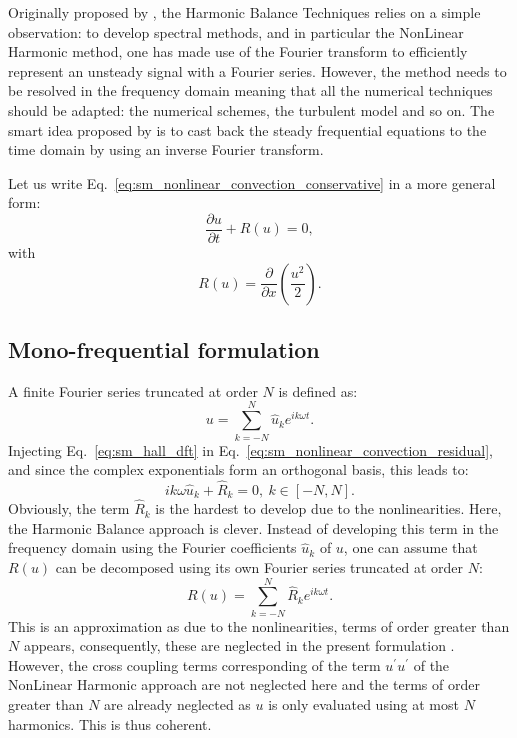 Originally proposed by \citet{Hall2002}, the Harmonic Balance Techniques
relies on a simple observation: to develop spectral methods, and in
particular the NonLinear Harmonic method, one has made use of the Fourier
transform to efficiently represent an unsteady signal with a Fourier series.
However, the method needs to be resolved in the frequency domain meaning
that all the numerical techniques should be adapted: the numerical schemes,
the turbulent model and so on. The smart idea 
proposed by \citet{Hall2002} is to
cast back the steady frequential equations to the time domain
by using an inverse Fourier transform.

Let us write Eq.~\ref{eq:sm_nonlinear_convection_conservative} 
in a more general form:
\begin{equation}
	\frac{\partial u}{\partial t} + R (u) = 0,
	\label{eq:sm_nonlinear_convection_residual}
\end{equation}
with
\begin{equation}
	R(u) = \frac{\partial}{\partial x} \left( 
	\frac{u^2}{2} \right).
\end{equation}

\subsection{Mono-frequential formulation}
A finite Fourier series truncated at order $N$ is defined as:
\begin{equation}
	u = \sum_{k=-N}^{N} 
	\widehat{u}_k e^{i k \omega t}.
	\label{eq:sm_hall_dft}
\end{equation}
Injecting Eq.~\ref{eq:sm_hall_dft} in 
Eq.~\ref{eq:sm_nonlinear_convection_residual}, and since
the complex exponentials form an orthogonal basis, 
this leads to:
\begin{equation}
	i k \omega \widehat{u}_k + \widehat{R}_k = 0, \: k \in [-N, N].
	\label{eq:sm_hall_frequential_eq}
\end{equation}
Obviously, the term $\widehat{R}_k$ is the hardest to develop
due to the nonlinearities. Here, the Harmonic Balance approach
is clever. 
Instead of developing this term in the frequency domain
using the Fourier coefficients $\widehat{u}_k$ of $u$,
one can assume that $R(u)$ can be decomposed using its own Fourier series
truncated at order $N$:
\begin{equation}
	R(u) = \sum_{k=-N}^{N} 
	\widehat{R}_k e^{i k \omega t}.
\end{equation}
This is an approximation as due to the nonlinearities, 
terms of order greater than $N$ appears, consequently, 
these are neglected in the present
formulation . However, the cross coupling terms corresponding
of the term $u^\prime u^\prime$ of the NonLinear Harmonic 
approach are not neglected here and
the terms of order greater
than $N$ are already neglected as $u$ is only evaluated using 
at most $N$ harmonics. This is thus coherent.

